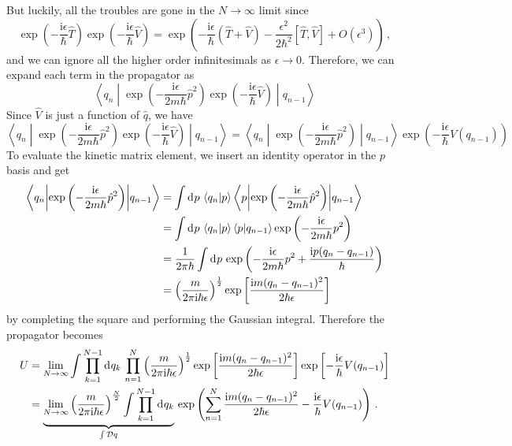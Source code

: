 \documentclass{article}
\theoremstyle{plain}\theoremheaderfont{\normalfont\itshape}\theorembodyfont{\rmfamily}\theoremseparator{.}\newtheorem*{rem}{Remark}\newtheorem*{ex}{Example}\newtheorem*{proof}{Proof}\newtheorem*{altp}{Alternative proof}
\theoremstyle{plain}\theoremheaderfont{\normalfont\bfseries}\theorembodyfont{\rmfamily}\theoremseparator{.}\newtheorem{thm}{Theorem}[section]\newtheorem{lem}[thm]{Lemma}\newtheorem{prop}[thm]{Proposition}\newtheorem*{cor}{Corollary}\newtheorem{defn}[thm]{Definition}\newtheorem{clm}[thm]{Claim}\newtheorem{clminproof}{Claim}
\theoremstyle{break}\theoremheaderfont{\normalfont\itshape}\theorembodyfont{\rmfamily}\theoremseparator{.\medskip}\newtheorem*{proofskip}{Proof}\newtheorem*{exs}{Examples}\newtheorem*{rems}{Remarks}
\theoremstyle{break}\theoremheaderfont{\normalfont\bfseries}\theorembodyfont{\rmfamily}\theoremseparator{.\medskip}\newtheorem{lemskip}[thm]{Lemma}\newtheorem{defnskip}[thm]{Definition}\newtheorem{propskip}[thm]{Proposition}\newtheorem{thmskip}[thm]{Theorem}
\numberwithin{equation}{section}
\newcommand{\ii}{\mathrm{i}}
\newcommand{\dd}[2][]{\mathrm{d}^{#1} #2\,}
\renewcommand{\d}[2][]{\mathrm{d}^{#1} #2}
\newcommand{\D}[1]{\mathcal{D} #1}
\newcommand{\braket}[2]{\left\langle #1 \middle| #2 \right\rangle}
\newcommand{\mel}[3]{\left\langle #1 \middle| #2 \middle| #3 \right\rangle}
\begin{document}
    But luckily, all the troubles are gone in the \(N\to\infty\) limit since
    \begin{equation}
        \exp\left(-\frac{\ii\epsilon}{\hbar}\hat{T}\right)\exp\left(-\frac{\ii\epsilon}{\hbar}\hat{V}\right)=\exp\left(-\frac{\ii\epsilon}{\hbar}(\hat{T}+\hat{V})-\frac{\epsilon^2}{2\hbar^2}[\hat{T},\hat{V}]+O(\epsilon^3)\right)\,,
    \end{equation}
    and we can ignore all the higher order infinitesimals as \(\epsilon\to 0\). Therefore, we can expand each term in the propagator as
    \begin{equation}
        \mel{q_n}{\exp\left(-\frac{\ii\epsilon}{2m\hbar}\hat{p}^2\right)\exp\left(-\frac{\ii\epsilon}{\hbar}\hat{V}\right)}{q_{n-1}}
    \end{equation}
    Since \(\hat{V}\) is just a function of \(\hat{q}\), we have
    \begin{equation}
        \mel{q_n}{\exp\left(-\frac{\ii\epsilon}{2m\hbar}\hat{p}^2\right)\exp\left(-\frac{\ii\epsilon}{\hbar}\hat{V}\right)}{q_{n-1}}=\mel{q_n}{\exp\left(-\frac{\ii\epsilon}{2m\hbar}\hat{p}^2\right)}{q_{n-1}}\exp\left(-\frac{\ii\epsilon}{\hbar}V(q_{n-1})\right)
    \end{equation}
    To evaluate the kinetic matrix element, we insert an identity operator in the \(p\) basis and get
    \begin{align}
        \mel{q_n}{\exp\left(-\frac{\ii\epsilon}{2m\hbar}\hat{p}^2\right)}{q_{n-1}}&=\int\dd{p}\braket{q_n}{p}\mel{p}{\exp\left(-\frac{\ii\epsilon}{2m\hbar}\hat{p}^2\right)}{q_{n-1}}\notag\\
        &=\int\dd{p}\braket{q_n}{p}\braket{p}{q_{n-1}}\exp\left(-\frac{\ii\epsilon}{2m\hbar}p^2\right)\notag\\
        &=\frac{1}{2\pi\hbar}\int\dd{p}\exp\left(-\frac{\ii\epsilon}{2m\hbar}p^2+\frac{\ii p(q_n-q_{n-1})}{\hbar}\right)\notag \\
        &=\left(\frac{m}{2\pi\ii\hbar\epsilon}\right)^{\frac{1}{2}}\exp\left[\frac{\ii m(q_n - q_{n-1})^2}{2\hbar\epsilon}\right]
    \end{align}
    by completing the square and performing the Gaussian integral. Therefore the propagator becomes
    \begin{align}
        U&=\lim_{N\to\infty}\int\prod_{k=1}^{N-1}\dd{q_k} \prod_{n=1}^{N}\left(\frac{m}{2\pi\ii\hbar\epsilon}\right)^{\frac{1}{2}}\exp\left[\frac{\ii m(q_n - q_{n-1})^2}{2\hbar\epsilon}\right]\exp\left[-\frac{\ii\epsilon}{\hbar}V(q_{n-1})\right]\notag \\
        &=\underbrace{\lim_{N\to\infty}\left(\frac{m}{2\pi\ii\hbar\epsilon}\right)^{\frac{N}{2}}\int\prod_{k=1}^{N-1}\d{q_k}}_{\int \D{q}}\,\exp\left(\sum_{n=1}^{N}\frac{\ii m(q_n-q_{n-1})^2}{2\hbar\epsilon}-\frac{\ii\epsilon}{\hbar}V(q_{n-1})\right)\,.
    \end{align}
\end{document}
